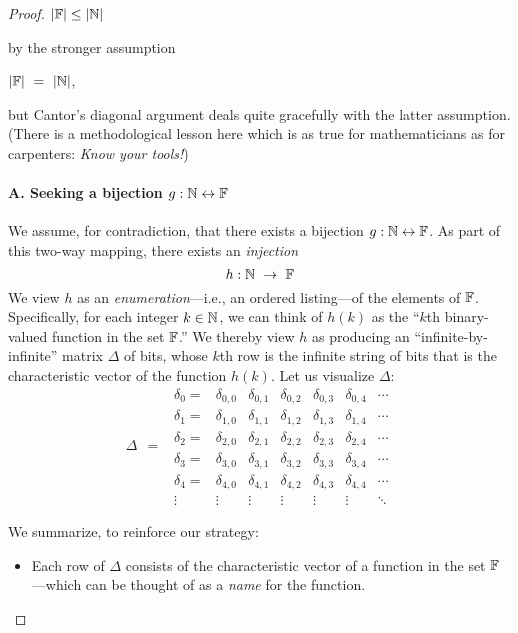 \begin{proof}
\hspace*{.35in}$|\mathbb{F}| \leq |\mathbb{N}|$

\smallskip

\noindent
by the stronger assumption

\smallskip

\hspace*{.35in}$|\mathbb{F}| \ = \ |\mathbb{N}|$,

\smallskip

\noindent
but Cantor's diagonal argument deals quite gracefully with the latter assumption.  (There is a methodological lesson here which is as true for mathematicians as for carpenters:  {\em Know your tools!})

\paragraph{A. Seeking a bijection $g: \mathbb{N} \leftrightarrow \mathbb{F}$}

We assume, for contradiction, that there exists a bijection $g: \mathbb{N} \leftrightarrow \mathbb{F}$.  As part of this two-way mapping, there exists an {\em injection}
\[ 
h: \mathbb{N} \ \rightarrow \ \mathbb{F}
\]
We view $h$ as an {\em enumeration}---i.e., an ordered listing---of the elements of $\mathbb{F}$.  Specifically, for each integer $k \in \mathbb{N}$, we can think of $h(k)$ as the ``$k$th binary-valued function in the set $\mathbb{F}$.''  We thereby view $h$ as producing an ``infinite-by-infinite'' matrix $\Delta$ of bits, whose $k$th row is the infinite string of bits that is the characteristic vector of the
function $h(k)$.  Let us visualize $\Delta$:
\[ \Delta \ \ = \ \
\begin{array}{ccccccc}
\delta_0 = &
\delta_{0,0} & \delta_{0,1} & \delta_{0,2} & \delta_{0,3} &
	\delta_{0,4} & \cdots \\
\delta_1 = &
\delta_{1,0} & \delta_{1,1} & \delta_{1,2} & \delta_{1,3} &
	\delta_{1,4} & \cdots \\
\delta_2 = &
\delta_{2,0} & \delta_{2,1} & \delta_{2,2} & \delta_{2,3} &
	\delta_{2,4} & \cdots \\
\delta_3 = &
\delta_{3,0} & \delta_{3,1} & \delta_{3,2} & \delta_{3,3} &
	\delta_{3,4} & \cdots \\ 
\delta_4 = &
\delta_{4,0} & \delta_{4,1} & \delta_{4,2} & \delta_{4,3} &
	\delta_{4,4} & \cdots \\ 
\vdots &
\vdots  & \vdots  & \vdots  & \vdots  & \vdots  & \ddots
\end{array}
\]

\noindent We summarize, to reinforce our strategy:
\begin{itemize}
\item
Each row of $\Delta$ consists of the characteristic vector of a function in the set $\mathbb{F}$---which can be thought of as a {\em name} for the function.


\end{itemize}
\end{proof}
